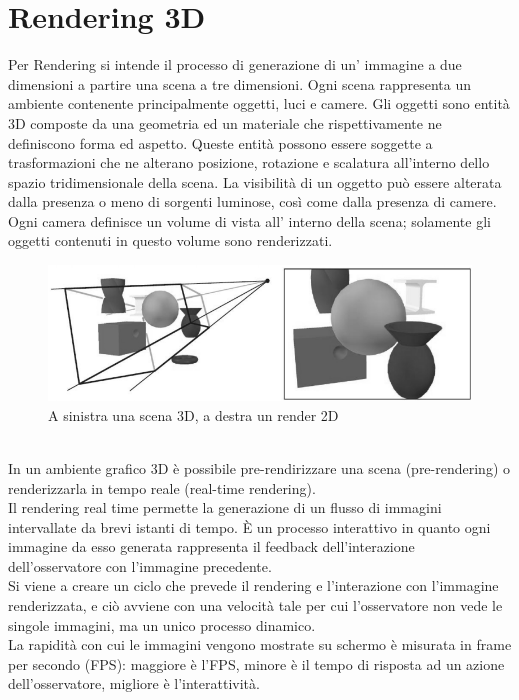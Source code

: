 \section{Rendering 3D}
\label{sec:chapter_stato_arte_rendering3d}

Per Rendering si intende il processo di generazione di un’ immagine a due dimensioni a partire una scena a tre dimensioni.
Ogni scena rappresenta un  ambiente contenente principalmente oggetti, luci e camere.
Gli oggetti sono entità 3D composte da una geometria ed un materiale che rispettivamente ne definiscono forma ed aspetto. Queste entità possono essere soggette a trasformazioni che ne alterano posizione, rotazione e scalatura all’interno dello spazio tridimensionale della scena.
La visibilità di un oggetto può essere alterata dalla presenza o meno di sorgenti luminose, così come dalla presenza di camere.
Ogni camera definisce un volume di vista all’ interno della scena; solamente gli oggetti contenuti in questo volume sono renderizzati.
\\
\begin{figure}[htb]
 \centering
 \includegraphics[width=0.9\linewidth]{images/chapter_stato_arte/stato_arte_rendering_3d.png}\hfill
 \caption[Rendering 3D]{A sinistra una scena 3D, a destra un render 2D}
 \label{fig:stato_arte_rendering_3d}
\end{figure}
\\
In un ambiente grafico 3D è possibile pre-rendirizzare una scena (pre-rendering) o renderizzarla in tempo reale (real-time rendering).
\\
Il rendering real time permette la generazione di un flusso di immagini intervallate da brevi istanti di tempo.
È un processo interattivo in quanto ogni immagine da esso generata rappresenta il feedback dell’interazione dell’osservatore con l’immagine precedente.
\\ 
Si viene a creare un ciclo che prevede il rendering e l’interazione con l’immagine renderizzata, e ciò avviene con una velocità tale per cui l’osservatore non vede le singole immagini, ma un unico processo dinamico.
\\ 
La rapidità con cui le immagini vengono mostrate su schermo è misurata in frame per secondo (FPS): maggiore è l’FPS, minore è il tempo di risposta ad un azione dell’osservatore, migliore è l’interattività.
